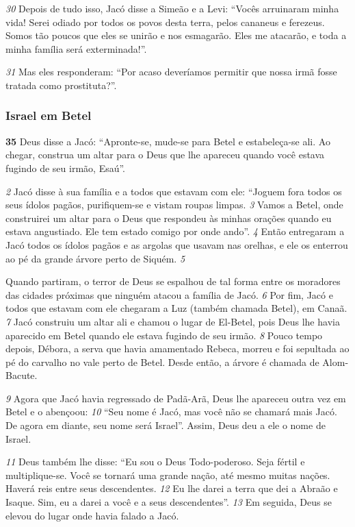 \bigskip   
\textit{\tiny 30}
Depois de tudo isso, Jacó disse a Simeão e a Levi: “Vocês arruinaram minha
vida! Serei odiado por todos os povos desta terra, pelos cananeus e ferezeus.
Somos tão poucos que eles se unirão e nos esmagarão. Eles me atacarão, e toda a
minha família será exterminada!”.
   
\bigskip   
\textit{\tiny 31}
Mas eles responderam: “Por acaso deveríamos permitir que nossa irmã fosse
tratada como prostituta?”.
   
\bigskip   
\subsubsection*{Israel em Betel}
\textbf{\large 35}
 Deus disse a Jacó: “Apronte-se, mude-se para Betel e estabeleça-se ali. Ao
chegar, construa um altar para o Deus que lhe apareceu quando você estava
fugindo de seu irmão, Esaú”. 

\bigskip   
\textit{\tiny 2} 
Jacó disse à sua família e a todos que estavam com ele: “Joguem fora todos os
seus ídolos pagãos, purifiquem-se e vistam roupas limpas. 
\textit{\tiny 3} 
Vamos a Betel, onde
construirei um altar para o Deus que respondeu às minhas orações quando eu
estava angustiado. Ele tem estado comigo por onde ando”. 
\textit{\tiny 4} 
Então   entregaram a Jacó todos os ídolos pagãos e as argolas que usavam nas
orelhas, e ele os enterrou ao pé da grande árvore perto de Siquém. 
\textit{\tiny 5} 

\bigskip   
Quando
partiram, o terror de Deus se espalhou de tal forma entre os moradores das
cidades próximas que ninguém atacou a família de Jacó. 
\textit{\tiny 6} 
Por fim, Jacó e todos que estavam com ele chegaram a Luz (também chamada
Betel), em Canaã. 
\textit{\tiny 7} 
Jacó construiu um altar ali e chamou o lugar de El-Betel,
 pois
Deus lhe havia aparecido em Betel quando ele estava fugindo de seu irmão. 
\textit{\tiny 8} 
Pouco tempo depois, Débora, a serva que havia amamentado Rebeca, morreu e
foi sepultada ao pé do carvalho no vale perto de Betel. Desde então, a árvore é
chamada de Alom-Bacute. 

\bigskip   
\textit{\tiny 9} 
Agora que Jacó havia regressado de Padã-Arã, Deus lhe apareceu outra vez em
Betel e o abençoou: 
\textit{\tiny 10}
“Seu nome é Jacó, mas você não se chamará mais Jacó. De
agora em diante, seu nome será Israel”. Assim, Deus deu a ele o nome de Israel.
   
\bigskip   
\textit{\tiny 11}
Deus também lhe disse: “Eu sou o Deus Todo-poderoso.
 Seja fértil e
multiplique-se. Você se tornará uma grande nação, até mesmo muitas nações.
Haverá reis entre seus descendentes. 
\textit{\tiny 12}
Eu lhe darei a terra que dei a Abraão e
Isaque. Sim, eu a darei a você e a seus descendentes”. 
\textit{\tiny 13}
Em seguida, Deus se
elevou do lugar onde havia falado a Jacó.
   
